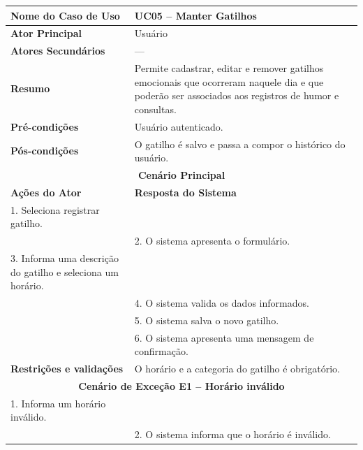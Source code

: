 
\begin{longtable}{| p{} | p{} |}
\hline

\textbf{Nome do Caso de Uso} &
UC05 -- Manter Gatilhos \\
\hline

\textbf{Ator Principal} &
Usuário \\
\hline

\textbf{Atores Secundários} &
--- \\
\hline

\textbf{Resumo} &
Permite cadastrar, editar e remover gatilhos emocionais que
ocorreram naquele dia e que poderão ser associados aos registros
de humor e consultas. \\

\hline

\textbf{Pré-condições} &
Usuário autenticado. \\
\hline

\textbf{Pós-condições} &
O gatilho é salvo e passa a compor o histórico do usuário. \\
\hline

\multicolumn{2}{|c|}{\textbf{Cenário Principal}}\\
\hline

\textbf{Ações do Ator} &
\textbf{Resposta do Sistema} \\
\hline

1. Seleciona registrar gatilho. & \\
\cline{1-2}

&
2. O sistema apresenta o formulário. \\
\cline{1-2}

3. Informa uma descrição do gatilho e seleciona um horário. & \\
\cline{1-2}

&
4. O sistema valida os dados informados. \\
\cline{1-2}

&
5. O sistema salva o novo gatilho. \\
\cline{1-2}

&
6. O sistema apresenta uma mensagem de confirmação. \\
\hline

\multirow{1}{.40\textwidth}{\textbf{Restrições e validações}}
&
O horário e a categoria do gatilho é obrigatório. \\
\cline{1-2}

\multicolumn{2}{|c|}{\textbf{Cenário de Exceção E1 -- Horário inválido}}\\
\hline

1. Informa um horário inválido. & \\
\cline{1-2}

&
2. O sistema informa que o horário é inválido. \\
\hline

\end{longtable}
